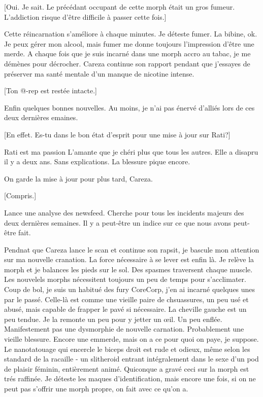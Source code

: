 [Oui. Je sait. Le précédant occupant de cette morph était un gros fumeur. L'addiction risque d'être difficile à passer cette fois.] 

Cette réincarnation s'améliore à chaque minutes. Je déteste fumer. La bibine, ok. Je peux gérer mon alcool, mais fumer me donne toujours l'impression d'être une merde. A chaque fois que je suis incarné dans une morph accro au tabac, je me démènes pour décrocher. Careza continue son rapport pendant que j'essayes de préserver ma santé mentale d'un manque de nicotine intense. 

[Ton @-rep est restée intacte.] 

Enfin quelques bonnes nouvelles. Au moins, je n'ai pas énervé d'alliés lors de ces deux dernières emaines. 

[En effet. Es-tu dans le bon état d'esprit pour une mise à jour sur Rati?] 

Rati est ma passion L'amante que je chéri plus que tous les autres. Elle a disapru il y a deux ans. Sans explications. La blessure pique encore. 

On garde la mise à jour pour plus tard, Careza. 

[Compris.] 

Lance une analyse des newsfeed. Cherche pour tous les incidents majeurs des deux dernières semaines. Il y a peut-être un indice sur ce que nous avons peut-être fait. 

Pendnat que Careza lance le scan et continue son rapsit, je bascule mon attention sur ma nouvelle cranation. La force nécessaire à se lever est enfin là. Je relève la morph et je balances les pieds sur le sol. Des spasmes traversent chaque muscle. Les nouvelels morphs nécessitent toujours un peu de temps pour s'acclimater. Coup de bol, je suis un habitué des fury CoreCorp, j'en ai incarné quelques unes par le passé. Celle-là est comme une vieille paire de chsuassures, un peu usé et abusé, mais capable de frapper le pavé si nécessaire. La cheville gauche est un peu tendue. Je la remonte un peu pour y jetter un œil. Un peu enflée. Manifestement pas une dysmorphie de nouvelle carnation. Probablement une vieille blessure. Encore une emmerde, mais on a ce pour quoi on paye, je suppose. Le nanotatouage qui encercle le biceps droit est rude et odieux, même selon les standard de la racaille - un slitheroid entrant intégralement dans le sexe d'un pod de plaisir féminin, entièrement animé. Quiconque a gravé ceci sur la morph est trés raffinée. Je déteste les maques d'identification, mais encore une fois, si on ne peut pas s'offrir une morph propre, on fait avec ce qu'on a. 

